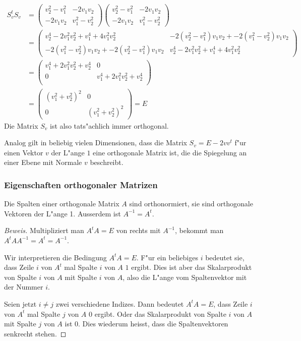 \begin{align*}
S_v^tS_v
&=
\begin{pmatrix}
v_2^2-v_1^2&-2v_1v_2\\
-2v_1v_2&v_1^2-v_2^2
\end{pmatrix}
\begin{pmatrix}
v_2^2-v_1^2&-2v_1v_2\\
-2v_1v_2&v_1^2-v_2^2
\end{pmatrix}
\\
&=
\begin{pmatrix}
v_2^4-2v_1^2v_2^2+v_1^4+4v_1^2v_2^2&
-2(v_2^2-v_1^2)v_1v_2
+
-2(v_1^2-v_2^2)v_1v_2
\\
-2(v_1^2-v_2^2)v_1v_2
+
-2(v_2^2-v_1^2)v_1v_2
&
v_2^4-2v_1^2v_2^2+v_1^4+4v_1^2v_2^2
\end{pmatrix}
\\
&=
\begin{pmatrix}
v_1^4+2v_1^2v_2^2+v_2^4&0\\
0&v_1^4+2v_1^2v_2^2+v_2^4\\
\end{pmatrix}
\\
&=
\begin{pmatrix}
(v_1^2+v_2^2)^2&0\\
0&(v_1^2+v_2^2)^2
\end{pmatrix}=E
\end{align*}
Die Matrix $S_v$ ist also tats"achlich immer orthogonal.

Analog gilt in beliebig vielen Dimensionen, dass die Matrix
$S_v=E-2v v^t$  f"ur einen Vektor $v$ der L"ange $1$ eine orthogonale
Matrix ist, die die Spiegelung an einer Ebene mit Normale $v$
beschreibt.

\subsubsection{Eigenschaften orthogonaler Matrizen}

\begin{satz}
Die Spalten einer orthogonale Matrix $A$ sind orthonormiert, sie sind
orthogonale Vektoren der L"ange 1.
Ausserdem ist $A^{-1}=A^t$.
\end{satz}

\begin{proof}[Beweis]
Multipliziert man $A^tA=E$ von rechts mit $A^{-1}$, bekommt man
$A^tAA^{-1}=A^t=A^{-1}$.

Wir interpretieren die Bedingung $A^tA=E$.
F"ur ein beliebiges $i$
bedeutet sie, dass Zeile $i$ von $A^t$ mal Spalte $i$ von $A$ $1$ ergibt.
Dies ist aber das Skalarprodukt von Spalte $i$ von $A$ mit Spalte $i$
von $A$, also die L"ange vom Spaltenvektor mit der Nummer $i$.

Seien jetzt $i\ne j$ zwei verschiedene Indizes.
Dann bedeutet $A^tA=E$,
dass Zeile $i$ von $A^t$ mal Spalte $j$ von $A$ $0$ ergibt.
Oder das
Skalarprodukt von Spalte $i$ von $A$ mit Spalte $j$ von $A$ ist $0$.
Dies wiederum heisst, dass die Spaltenvektoren senkrecht stehen.
\end{proof}

